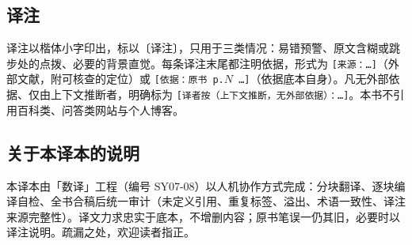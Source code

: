 \subsection*{译注}

译注以楷体小字印出，标以〔译注〕，只用于三类情况：易错预警、原文含糊或跳步处的点拨、必要的背景直觉。每条译注末尾都注明依据，形式为
\texttt{[来源：\ldots]}（外部文献，附可核查的定位）或 \texttt{[依据：原书 p.$N$ \ldots]}（依据底本自身）。凡无外部依据、仅由上下文推断者，明确标为 \texttt{[译者按（上下文推断，无外部依据）：\ldots]}。本书不引用百科类、问答类网站与个人博客。

\subsection*{关于本译本的说明}

本译本由「数译」工程（编号 SY07-08）以人机协作方式完成：分块翻译、逐块编译自检、全书合稿后统一审计（未定义引用、重复标签、溢出、术语一致性、译注来源完整性）。译文力求忠实于底本，不增删内容；原书笔误一仍其旧，必要时以译注说明。疏漏之处，欢迎读者指正。

